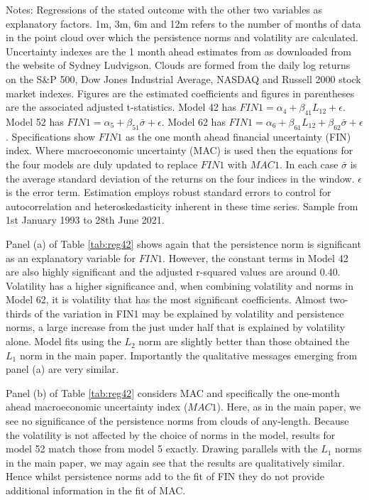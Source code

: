 \documentclass{article}
\begin{document}
\begin{sidewaystable}
\begin{center}
\begin{tabular}{ll l c c c c c c c c c c c c c}
             \hline
        \end{tabular}
    \end{center}
\footnotesize{Notes: Regressions of the stated outcome with the other two variables as explanatory factors. 1m, 3m, 6m and 12m refers to the number of months of data in the point cloud over which the persistence norms and volatility are calculated. Uncertainty indexes are the 1 month ahead estimates from \cite{jurado2015measuring} as downloaded from the website of Sydney Ludvigson. Clouds are formed from the daily log returns on the S\&P 500, Dow Jones Industrial Average, NASDAQ and Russell 2000 stock market indexes. Figures are the estimated coefficients and figures in parentheses are the associated \cite{newey1987simple} adjusted t-statistics. Model 42 has $FIN1 = \alpha_4 + \beta_{41}L_{12} + \epsilon$. Model 52 has $FIN1 = \alpha_5 + \beta_{51}\bar{\sigma} + \epsilon$. Model 62 has $FIN1 = \alpha_6 + \beta_{61}L_{12} + \beta_{62}\bar{\sigma}+\epsilon$. Specifications show $FIN1$ as the one month ahead financial uncertainty (FIN) index. Where macroeconomic uncertainty (MAC) is used then the equations for the four models are duly updated to replace $FIN1$ with $MAC1$. In each case $\bar{\sigma}$ is the average standard deviation of the returns on the four indices in the window. $\epsilon$ is the error term. Estimation employs \cite{newey1987simple} robust standard errors to control for autocorrelation and heteroskedasticity inherent in these time series. Sample from 1st January 1993 to 28th June 2021.}
\end{sidewaystable}

Panel (a) of Table \ref{tab:reg42} shows again that the persistence norm is significant as an explanatory variable for $FIN1$. However, the constant terms in Model 42 are also highly significant and the adjusted r-squared values are around 0.40. Volatility has a higher significance and, when combining volatility and norms in Model 62, it is volatility that has the most significant coefficients. Almost two-thirds of the variation in FIN1 may be explained by volatility and persistence norms, a large increase from the just under half that is explained by volatility alone. Model fits using the $L_2$ norm are slightly better than those obtained the $L_1$ norm in the main paper. Importantly the qualitative messages emerging from panel (a) are very similar. 

Panel (b) of Table \ref{tab:reg42} considers MAC and specifically the one-month ahead macroeconomic uncertainty index ($MAC1$). Here, as in the main paper, we see no significance of the persistence norms from clouds of any-length. Because the volatility is not affected by the choice of norms in the model, results for model 52 match those from model 5 exactly. Drawing parallels with the $L_1$ norms in the main paper, we may again see that the results are qualitatively similar. Hence whilst persistence norms add to the fit of FIN they do not provide additional information in the fit of MAC. 
\end{document}
